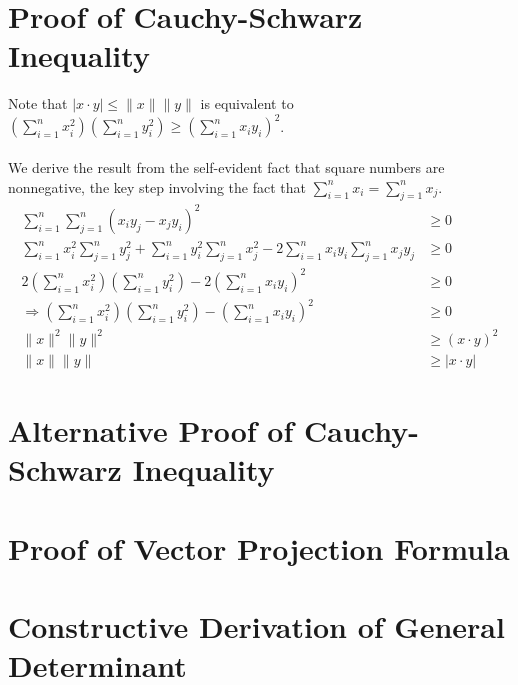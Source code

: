 \documentclass[a4, 12pt]{article}
\newcommand{\no}[1]{\lVert #1 \rVert}
\begin{document}
\section{Proof of Cauchy-Schwarz Inequality}
Note that $|x \cdot y| \leq \no{x}\no{y}$ is equivalent to $\left( \sum\limits_{i=1}^n x_i^2 \right) \left( \sum\limits_{i=1}^n y_i^2 \right) \geq \left( \sum\limits_{i=1}^n x_i y_i \right)^2$.\\~\\
We derive the result from the self-evident fact that square numbers are nonnegative, the key step involving the fact that $\sum\limits_{i=1}^n x_i = \sum\limits_{j=1}^n x_j$.
\begin{align*}
    \sum\limits_{i=1}^n \sum\limits_{j=1}^n (x_i y_j - x_j y_i)^2 &\geq 0 \\
    \sum\limits_{i=1}^n x_i^2 \sum\limits_{j=1}^n y_j^2 +\sum\limits_{i=1}^n y_i^2 \sum\limits_{j=1}^n x_j^2 - 2\sum\limits_{i=1}^n x_i y_i \sum\limits_{j=1}^n x_j y_j &\geq 0 \\
    2\left( \sum\limits_{i=1}^n x_i^2 \right)\left( \sum\limits_{i=1}^n y_i^2 \right) - 2\left( \sum\limits_{i=1}^n x_i y_i \right)^2 &\geq 0  \\
    \Rightarrow \left( \sum\limits_{i=1}^n x_i^2 \right)\left( \sum\limits_{i=1}^n y_i^2 \right) - \left( \sum\limits_{i=1}^n x_i y_i \right)^2 &\geq 0 \\
    \no{x}^2\no{y}^2 &\geq (x \cdot y)^2 \\
    \no{x}\no{y} &\geq |x \cdot y|
\end{align*}
\section{Alternative Proof of Cauchy-Schwarz Inequality}


\section{Proof of Vector Projection Formula}


\section{Constructive Derivation of General Determinant}




\end{document}

